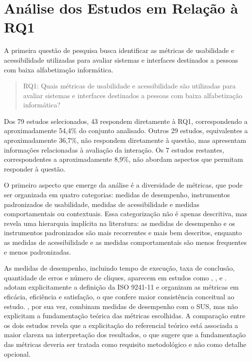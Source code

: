 \section{Análise dos Estudos em Relação à RQ1}

A primeira questão de pesquisa busca identificar as métricas de usabilidade e acessibilidade utilizadas para avaliar sistemas e interfaces destinados a pessoas com baixa alfabetização informática.

\begin{quote}

RQ1: Quais métricas de usabilidade e acessibilidade são utilizadas para avaliar sistemas e interfaces destinados a pessoas com baixa alfabetização informática?

\end{quote}

Dos 79 estudos selecionados, 43 respondem diretamente à RQ1, correspondendo a aproximadamente 54,4\% do conjunto analisado. Outros 29 estudos, equivalentes a aproximadamente 36,7\%, não respondem diretamente à questão, mas apresentam informações relacionadas à avaliação da interação. Os 7 estudos restantes, correspondentes a aproximadamente 8,9\%, não abordam aspectos que permitam responder à questão.

O primeiro aspecto que emerge da análise é a diversidade de métricas, que pode ser organizada em quatro categorias: medidas de desempenho, instrumentos padronizados de usabilidade, medidas de acessibilidade e medidas comportamentais ou contextuais. Essa categorização não é apenas descritiva, mas revela uma hierarquia implícita na literatura: as medidas de desempenho e os instrumentos padronizados são mais recorrentes e mais bem descritos, enquanto as medidas de acessibilidade e as medidas comportamentais são menos frequentes e menos padronizadas.

As medidas de desempenho, incluindo tempo de execução, taxa de conclusão, quantidade de erros e número de cliques, aparecem em estudos como \cite{weighted_heuristic}, \cite{gatsou2017seniors}, \cite{xie2010usability} e \cite{ramineni2024enhancing}. \cite{gatsou2017seniors} adotam explicitamente a definição da ISO 9241-11 e organizam as métricas em eficácia, eficiência e satisfação, o que confere maior consistência conceitual ao estudo. \cite{weighted_heuristic}, por sua vez, combinam medidas de desempenho com o SUS, mas não explicitam a fundamentação teórica das métricas escolhidas. A comparação entre os dois estudos revela que a explicitação do referencial teórico está associada a maior clareza na interpretação dos resultados, o que sugere que a fundamentação das métricas deveria ser tratada como requisito metodológico e não como detalhe opcional.

